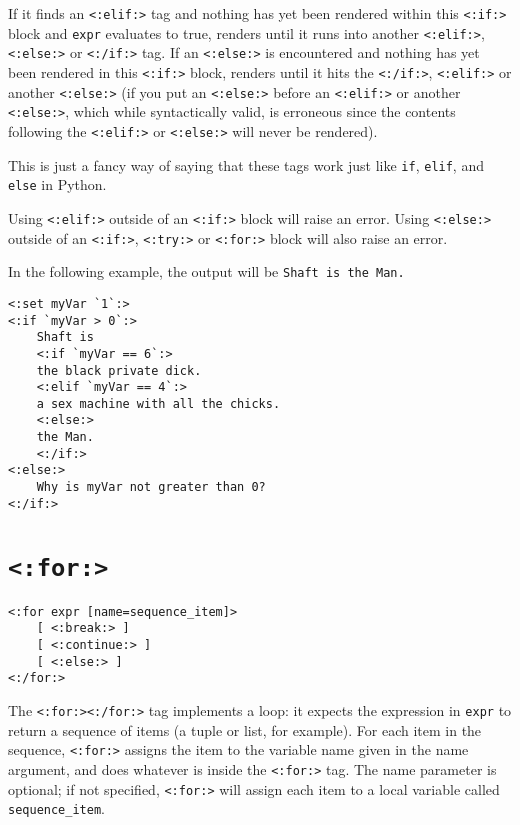 \documentclass{manual}
\begin{document}
If it finds an \texttt{<:elif:>} tag and nothing has yet 
been rendered within this \texttt{<:if:>} block and 
\texttt{expr} evaluates to true, renders until it runs into 
another \texttt{<:elif:>}, \texttt{<:else:>} or 
\texttt{<:/if:>} tag. If an \texttt{<:else:>} is 
encountered and nothing has yet been rendered in this 
\texttt{<:if:>} block, renders until it hits the 
\texttt{<:/if:>}, \texttt{<:elif:>} or another \texttt{<:else:>} 
(if you put an \texttt{<:else:>} before an \texttt{<:elif:>} 
or another \texttt{<:else:>}, which while syntactically valid, 
is erroneous since the contents following the 
\texttt{<:elif:>} or \texttt{<:else:>} will never be rendered).

This is just a fancy way of saying that these tags work just
like \texttt{if}, \texttt{elif}, and \texttt{else} in Python.

Using \texttt{<:elif:>} outside of an \texttt{<:if:>} block will raise
an error. Using \texttt{<:else:>} outside of an \texttt{<:if:>},
\texttt{<:try:>} or \texttt{<:for:>} block will also raise an error.

In the following example, the output will be \texttt{Shaft is the Man.}

\begin{verbatim}
<:set myVar `1`:>
<:if `myVar > 0`:>
    Shaft is
    <:if `myVar == 6`:>
    the black private dick.
    <:elif `myVar == 4`:>
    a sex machine with all the chicks.
    <:else:>
    the Man.
    <:/if:>
<:else:>
    Why is myVar not greater than 0?
<:/if:>
\end{verbatim}


\section{\texttt{<:for:>}}
\label{tagfor}

\begin{verbatim}<:for expr [name=sequence_item]> 
    [ <:break:> ]
    [ <:continue:> ]
    [ <:else:> ] 
<:/for:>
\end{verbatim}

The \texttt{<:for:><:/for:>} tag implements a loop: 
it expects the expression in \texttt{expr} to return a 
sequence of items (a tuple or list, for example). 
For each item in the sequence, \texttt{<:for:>} 
assigns the item to the variable name given 
in the name argument, and does whatever is 
inside the \texttt{<:for:>} tag. The name parameter 
is optional; if not specified, \texttt{<:for:>} 
will assign each item to a local variable 
called \texttt{sequence_item}.
\end{document}
